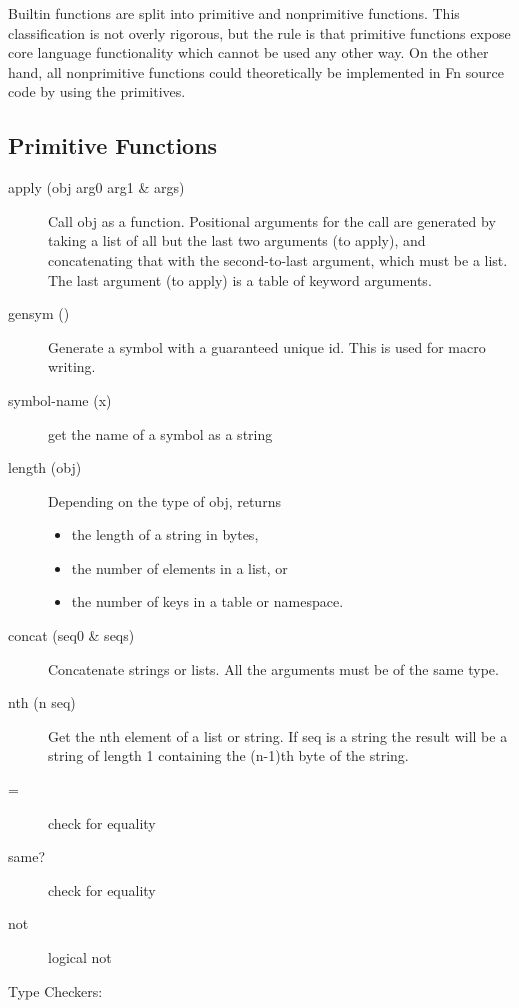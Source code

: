 \documentclass[11pt]{article}
\begin{document}
Builtin functions are split into primitive and nonprimitive functions. This
classification is not overly rigorous, but the rule is that primitive functions
expose core language functionality which cannot be used any other way. On the
other hand, all nonprimitive functions could theoretically be implemented in Fn
source code by using the primitives.

\subsection{Primitive Functions}
\label{sec:org4e804c2}

\begin{description}
\item[{apply (obj arg0 arg1 \& args)}] Call obj as a function. Positional arguments
for the call are generated by taking a list of all but the last two arguments
(to apply), and concatenating that with the second-to-last argument, which
must be a list. The last argument (to apply) is a table of keyword arguments.

\item[{gensym ()}] Generate a symbol with a guaranteed unique id. This is used for
macro writing.
\item[{symbol-name (x)}] get the name of a symbol as a string

\item[{length (obj)}] Depending on the type of obj, returns
\begin{itemize}
\item the length of a string in bytes,
\item the number of elements in a list, or
\item the number of keys in a table or namespace.
\end{itemize}
\item[{concat (seq0 \& seqs)}] Concatenate strings or lists. All the arguments must
be of the same type.
\item[{nth (n seq)}] Get the nth element of a list or string. If seq is a string the
result will be a string of length 1 containing the (n-1)th byte of the string.

\item[{=}] check for equality
\item[{same?}] check for equality
\item[{not}] logical not
\end{description}


Type Checkers:
\end{document}
